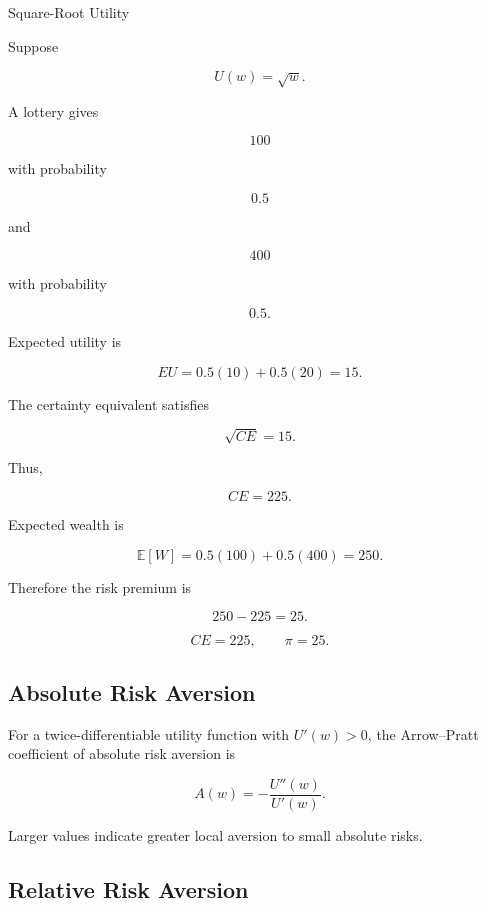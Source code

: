 \begin{workedexamplebox}{Square-Root Utility}

Suppose

\[
U(w)=\sqrt{w}.
\]

A lottery gives

\[
100
\]

with probability

\[
0.5
\]

and

\[
400
\]

with probability

\[
0.5.
\]

Expected utility is

\[
EU
=
0.5(10)
+
0.5(20)
=
15.
\]

The certainty equivalent satisfies

\[
\sqrt{CE}
=
15.
\]

Thus,

\[
CE
=
225.
\]

Expected wealth is

\[
\mathbb{E}[W]
=
0.5(100)
+
0.5(400)
=
250.
\]

Therefore the risk premium is

\[
250-225
=
25.
\]

\begin{answerbox}
\[
\boxed{
CE=225,
\qquad
\pi=25.
}
\]
\end{answerbox}

\end{workedexamplebox}

\subsection{Absolute Risk Aversion}
\label{subsec:absolute-risk-aversion}

For a twice-differentiable utility function with \(U'(w)>0\), the
Arrow--Pratt coefficient of absolute risk aversion is

\[
\boxed{
A(w)
=
-
\frac{
U''(w)
}{
U'(w)
}.
}
\]

Larger values indicate greater local aversion to small absolute risks.

\subsection{Relative Risk Aversion}
\label{subsec:relative-risk-aversion}

